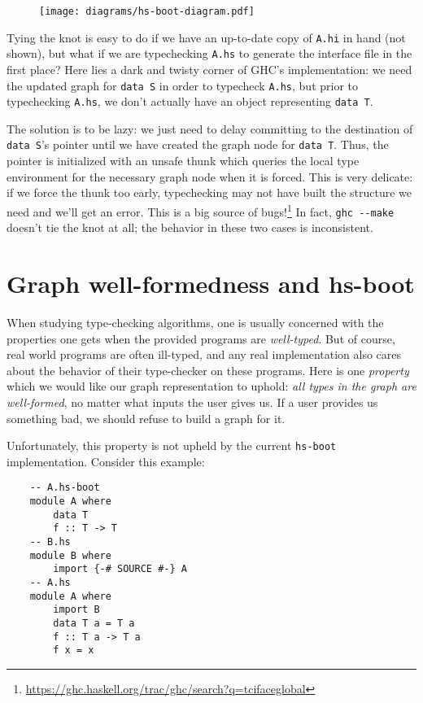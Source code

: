 \begin{figure}[H]
\texttt{[image: diagrams/hs-boot-diagram.pdf]}
\end{figure}

\noindent
Tying the knot is easy to do if we have an up-to-date copy of \verb|A.hi| in
hand (not shown), but what if we are typechecking \verb|A.hs| to generate the
interface file in the first place?  Here lies a dark and twisty corner
of GHC's implementation: we need the updated graph for \verb|data S| in order to typecheck
\verb|A.hs|, but prior to typechecking \verb|A.hs|, we don't actually have
an object representing \verb|data T|.

The solution is to be lazy: we just need to delay committing to the
destination of \verb|data S|'s pointer until we have created the graph node
for \verb|data T|.  Thus, the pointer is initialized with an unsafe thunk
which queries the local type environment for the necessary graph node
when it is forced.  This
is very delicate: if we force the thunk too early, typechecking may not
have built the structure we need and we'll get an error.  This is a big source of bugs!\footnote{\url{https://ghc.haskell.org/trac/ghc/search?q=tcifaceglobal}}  In fact,
\verb|ghc --make| doesn't tie the knot at all; the behavior in these
two cases is inconsistent.

\section{Graph well-formedness and hs-boot}

When studying type-checking algorithms, one is usually concerned with the
properties one gets when the provided programs are \emph{well-typed}.
But of course, real world programs are often ill-typed, and any real
implementation also cares about the behavior of their type-checker on
these programs.  Here is one \emph{property} which we would like our
graph representation to uphold: \emph{all types in the graph
are well-formed}, no matter what inputs the user gives
us.  If a user provides us something bad, we should refuse to
build a graph for it.

Unfortunately, this property is not upheld by the current \verb|hs-boot|
implementation.  Consider this example:

\begin{verbatim}
    -- A.hs-boot
    module A where
        data T
        f :: T -> T
    -- B.hs
    module B where
        import {-# SOURCE #-} A
    -- A.hs
    module A where
        import B
        data T a = T a
        f :: T a -> T a
        f x = x
\end{verbatim}

